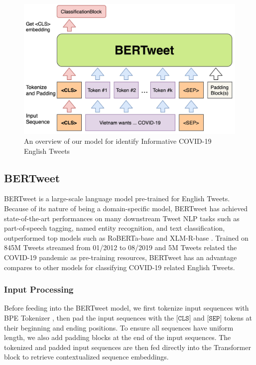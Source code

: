 \documentclass[11pt,a4paper]{article}
\begin{document}
\begin{figure}[ht]
    \centering
    \includegraphics[width=\columnwidth]{Model.jpg}
    \caption{An overview of our model for identify Informative COVID-19 English Tweets}
    \label{fig:model}
\end{figure}

\subsection{BERTweet}
BERTweet \cite{BERTweet} is a large-scale language model pre-trained for English Tweets. Because of its nature of being a domain-specific model, BERTweet has achieved state-of-the-art performances on many downstream Tweet NLP tasks such as part-of-speech tagging, named entity recognition, and text classification, outperformed top models such as RoBERTa-base \cite{1907.11692} and XLM-R-base \cite{1911.02116}. Trained on 845M Tweets streamed from 01/2012 to 08/2019 and 5M Tweets related the COVID-19 pandemic as pre-training resources, BERTweet has an advantage compares to other models for classifying COVID-19 related English Tweets.

\subsubsection{Input Processing}
Before feeding into the BERTweet model, we first tokenize input sequences with BPE Tokenizer \cite{1508.07909}, then pad the input sequences with the $\texttt{[CLS]}$ and $\texttt{[SEP]}$ tokens at their beginning and ending positions. To ensure all sequences have uniform length, we also add padding blocks at the end of the input sequences. The tokenized and padded input sequences are then fed directly into the Transformer block to retrieve contextualized sequence embeddings.
\end{document}
